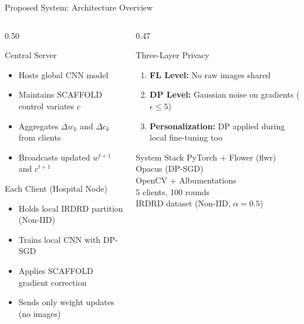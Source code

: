\documentclass[aspectratio=169, 11pt]{beamer}
\begin{document}
\begin{frame}{Proposed System: Architecture Overview}
  \begin{columns}[T]
    \begin{column}{0.50\textwidth}
      \begin{block}{Central Server}\small
        \begin{itemize}
          \item Hosts global CNN model
          \item Maintains SCAFFOLD control variates $c$
          \item Aggregates $\Delta w_k$ and $\Delta c_k$ from clients
          \item Broadcasts updated $w^{t+1}$ and $c^{t+1}$
        \end{itemize}
      \end{block}
      \vspace{4pt}
      \begin{block}{Each Client (Hospital Node)}\small
        \begin{itemize}
          \item Holds local IRDRD partition (Non-IID)
          \item Trains local CNN with DP-SGD
          \item Applies SCAFFOLD gradient correction
          \item Sends only weight updates (no images)
        \end{itemize}
      \end{block}
    \end{column}
    \begin{column}{0.47\textwidth}
      \begin{alertblock}{Three-Layer Privacy}\small
        \begin{enumerate}
          \item \textbf{FL Level:} No raw images shared
          \item \textbf{DP Level:} Gaussian noise on gradients ($\epsilon \leq 5$)
          \item \textbf{Personalization:} DP applied during local fine-tuning too
        \end{enumerate}
      \end{alertblock}
      \vspace{4pt}
      \begin{exampleblock}{System Stack}\small
        PyTorch + Flower (flwr)\\
        Opacus (DP-SGD)\\
        OpenCV + Albumentations\\
        5 clients, 100 rounds\\
        IRDRD dataset (Non-IID, $\alpha=0.5$)
      \end{exampleblock}
    \end{column}
  \end{columns}
\end{frame}
\end{document}
